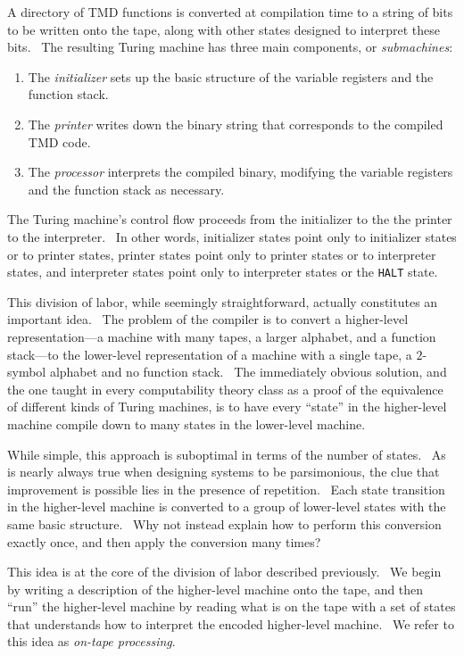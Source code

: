 \documentclass[11pt]{article}
\begin{document}
A directory of TMD functions is converted at compilation time to a string of bits to be written onto the tape, along with other states designed to interpret these bits. \ The resulting Turing machine has three main components, or \emph{submachines}:

\begin{enumerate}
\item The \emph{initializer} sets up the basic structure of the variable registers and the function stack.
\item The \emph{printer} writes down the binary string that corresponds to the compiled TMD code.
\item The \emph{processor} interprets the compiled binary, modifying the variable registers and the function stack as necessary.
\end{enumerate}

The Turing machine's control flow proceeds from the initializer to the the printer to the interpreter. \ In other words, initializer states point only to initializer states or to printer states, printer states point only to printer states or to interpreter states, and interpreter states point only to interpreter states or the \texttt{HALT} state.

This division of labor, while seemingly straightforward, actually constitutes an important idea. \ The problem of the compiler is to convert a higher-level representation---a machine with many tapes, a larger alphabet, and a function stack---to the lower-level representation of a machine with a single tape, a $2$-symbol alphabet and no function stack. \ The immediately obvious solution, and the one taught in every computability theory class as a proof of the equivalence of different kinds of Turing machines, is to have every ``state'' in the higher-level machine compile down to many states in the lower-level machine. %

While simple, this approach is suboptimal in terms of the number of states. \ As is nearly always true when designing systems to be parsimonious, the clue that improvement is possible lies in the presence of repetition. \ Each state transition in the higher-level machine is converted to a group of lower-level states with the same basic structure. \ Why not instead explain how to perform this conversion exactly once, and then apply the conversion many times?

This idea is at the core of the division of labor described previously. \ We begin by writing a description of the higher-level machine onto the tape, and then ``run'' the higher-level machine by reading what is on the tape with a set of states that understands how to interpret the encoded higher-level machine. \ We refer to this idea as \emph{on-tape processing}.
\end{document}
